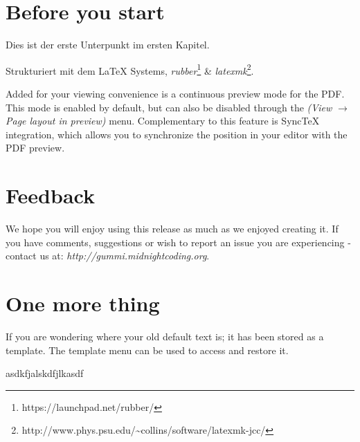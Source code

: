 \section{Before you start}

Dies ist der erste Unterpunkt im ersten Kapitel.

Strukturiert mit dem {\LaTeX} Systems, \emph{rubber}\footnote{https://launchpad.net/rubber/} \& \emph{latexmk}\footnote{http://www.phys.psu.edu/{\textasciitilde}collins/software/latexmk-jcc/}. 

Added for your viewing convenience is a continuous preview mode for the PDF. This mode is enabled by default, but can also be disabled through the \emph{(View $\rightarrow$ Page layout in preview)} menu. Complementary to this feature is SyncTeX integration, which allows you to synchronize the position in your editor with the PDF preview. 

\section{Feedback}
We hope you will enjoy using this release as much as we enjoyed creating it. If you have comments, suggestions or wish to report an issue you are experiencing - contact us at: \emph{http://gummi.midnightcoding.org}.

\section{One more thing}
If you are wondering where your old default text is; it has been stored as a template. The template menu can be used to access and restore it. 

\newpage

asdkfjalskdfjlkasdf